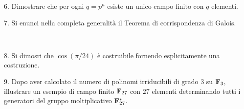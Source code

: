 \item{6.} Dimostrare che per ogni $q=p^n$ esiste un unico campo finito con $q$ elementi.

\vv \item{7.} Si enunci nella completa generalit\`a il Teorema di
corrispondenza di Galois.

\ve\ \vs

\item{8.} Si dimosri che $\cos(\pi/24)$ \`{e} costruibile fornendo esplicitamente una costruzione.

\vv

\item{9.} Dopo aver calcolato il numero di polinomi irriducibili di grado $3$ su
${\bf F}_3$, illustrare  un esempio di campo finito ${\bf F}_{27}$ con $27$
elementi determinando tutti i generatori del gruppo moltiplicativo
${\bf F}_{27}^*$.%

\ \vst
 \bye
